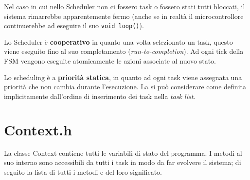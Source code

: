 Nel caso in cui nello Scheduler non ci fossero task o fossero stati tutti bloccati, il sistema rimarrebbe apparentemente fermo (anche se in realtà il microcontrollore continuerebbe ad eseguire il suo \texttt{void loop()}).

Lo Scheduler è \textbf{cooperativo} in quanto una volta selezionato un task, questo viene eseguito fino al suo completamento (\textit{run-to-completion}). Ad ogni tick della FSM vengono eseguite atomicamente le azioni associate al nuovo stato.

Lo scheduling è a \textbf{priorità statica}, in quanto ad ogni task viene assegnata una priorità che non cambia durante l'esecuzione. La si può considerare come definita implicitamente dall'ordine di inserimento dei task nella \textit{task list}.

\section{Context.h}\label{sec:contextimpl}
La classe Context contiene tutti le variabili di stato del programma. I metodi al suo interno sono accessibili da tutti i task in modo da far evolvere il sistema; di seguito la lista di tutti i metodi e del loro significato.
